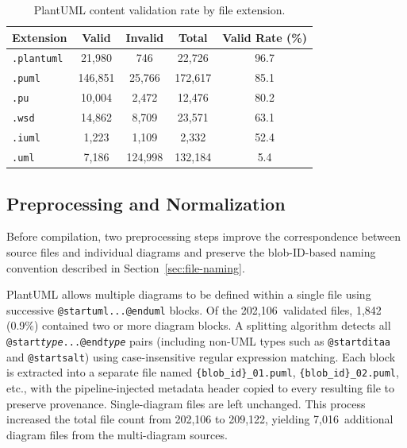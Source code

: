 \documentclass[11pt]{article}
\begin{document}
\begin{table}[H]
\caption{PlantUML content validation rate by file extension.\label{tab:extension-validation}}
\begin{tabularx}{\textwidth}{lCCCC}
\toprule
\textbf{Extension} & \textbf{Valid} & \textbf{Invalid} & \textbf{Total} & \textbf{Valid Rate (\%)} \\
\midrule
\texttt{.plantuml} & 21,980  & 746     & 22,726  & 96.7 \\
\texttt{.puml}     & 146,851 & 25,766  & 172,617 & 85.1 \\
\texttt{.pu}       & 10,004  & 2,472   & 12,476  & 80.2 \\
\texttt{.wsd}      & 14,862  & 8,709   & 23,571  & 63.1 \\
\texttt{.iuml}     & 1,223   & 1,109   & 2,332   & 52.4 \\
\texttt{.uml}      & 7,186   & 124,998 & 132,184 & 5.4 \\
\bottomrule
\end{tabularx}
\end{table}

\subsection{Preprocessing and Normalization}
\label{sec:preprocessing}

Before compilation, two preprocessing steps improve the correspondence between source files and individual diagrams and preserve the blob-ID-based naming convention described in Section~\ref{sec:file-naming}.

PlantUML allows multiple diagrams to be defined within a single file using successive \texttt{@startuml...@enduml} blocks. Of the 202,106~validated files, 1,842 (0.9\%) contained two or more diagram blocks. A splitting algorithm detects all \texttt{@start\textit{type}...@end\textit{type}} pairs (including non-UML types such as \texttt{@startditaa} and \texttt{@startsalt}) using case-insensitive regular expression matching. Each block is extracted into a separate file named \texttt{\{blob\_id\}\_01.puml}, \texttt{\{blob\_id\}\_02.puml}, etc., with the pipeline-injected metadata header copied to every resulting file to preserve provenance. Single-diagram files are left unchanged. This process increased the total file count from 202,106 to 209,122, yielding 7,016~additional diagram files from the multi-diagram sources.
\end{document}
